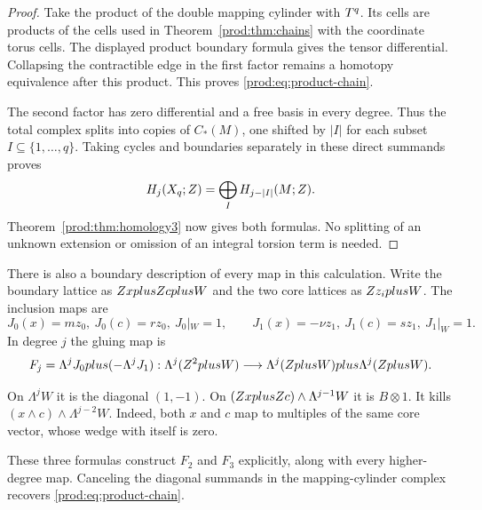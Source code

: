 \begin{proof}
Take the product of the double mapping cylinder with $T^q$.
Its cells are products of the cells used in Theorem~\ref{prod:thm:chains}
with the coordinate torus cells.  The displayed product boundary formula
gives the tensor differential.  Collapsing the contractible edge in the
first factor remains a homotopy equivalence after this product.
This proves \eqref{prod:eq:product-chain}.

The second factor has zero differential and a free basis in every degree.
Thus the total complex splits into copies of $C_*(M)$,
one shifted by $|I|$ for each subset $I\subseteq\{1,\ldots,q\}$.  Taking cycles and boundaries separately
in these direct summands proves
\[
 H_j(X_q;Z)=\bigoplus_I H_{j-|I|}(M;Z).
\]
Theorem~\ref{prod:thm:homology3} now gives both formulas.
No splitting of an unknown extension or omission of an integral torsion
term is needed.
\end{proof}

There is also a boundary description of every map in this calculation.
Write the boundary lattice as $Z xplusZ cplus W$ and the two
core lattices as $Z z_iplus W$.  The inclusion maps are
\[
 J_0(x)=mz_0,\ J_0(c)=rz_0,\ J_0|_W=1,
 \qquad
 J_1(x)=-\nu z_1,\ J_1(c)=sz_1,\ J_1|_W=1.
\]
In degree $j$ the gluing map is
\begin{equation}\label{prod:eq:exterior}
 F_j=\Lambda^jJ_0plus(-\Lambda^jJ_1):
 \Lambda^j(Z^2plus W)\longrightarrow
 \Lambda^j(Zplus W)plus\Lambda^j(Zplus W).
\end{equation}

On $\Lambda^jW$ it is the diagonal $(1,-1)$.
On $(Z xplusZ c)\wedge\Lambda^{j-1}W$ it is
$B\otimes1$.
It kills $(x\wedge c)\wedge\Lambda^{j-2}W$.
Indeed, both $x$ and $c$ map to multiples of the same core vector,
whose wedge with itself is zero.

These three formulas construct $F_2$ and $F_3$ explicitly, along
with every higher-degree map.  Canceling the diagonal summands in
the mapping-cylinder complex recovers \eqref{prod:eq:product-chain}.

